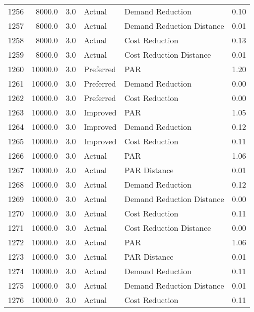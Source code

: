 \begin{longtable}{lrrllr}
1256 &       8000.0 &     3.0 &         Actual &           Demand Reduction &   0.10 \\
1257 &       8000.0 &     3.0 &         Actual &  Demand Reduction Distance &   0.01 \\
1258 &       8000.0 &     3.0 &         Actual &             Cost Reduction &   0.13 \\
1259 &       8000.0 &     3.0 &         Actual &    Cost Reduction Distance &   0.01 \\
1260 &      10000.0 &     3.0 &      Preferred &                        PAR &   1.20 \\
1261 &      10000.0 &     3.0 &      Preferred &           Demand Reduction &   0.00 \\
1262 &      10000.0 &     3.0 &      Preferred &             Cost Reduction &   0.00 \\
1263 &      10000.0 &     3.0 &       Improved &                        PAR &   1.05 \\
1264 &      10000.0 &     3.0 &       Improved &           Demand Reduction &   0.12 \\
1265 &      10000.0 &     3.0 &       Improved &             Cost Reduction &   0.11 \\
1266 &      10000.0 &     3.0 &         Actual &                        PAR &   1.06 \\
1267 &      10000.0 &     3.0 &         Actual &               PAR Distance &   0.01 \\
1268 &      10000.0 &     3.0 &         Actual &           Demand Reduction &   0.12 \\
1269 &      10000.0 &     3.0 &         Actual &  Demand Reduction Distance &   0.00 \\
1270 &      10000.0 &     3.0 &         Actual &             Cost Reduction &   0.11 \\
1271 &      10000.0 &     3.0 &         Actual &    Cost Reduction Distance &   0.00 \\
1272 &      10000.0 &     3.0 &         Actual &                        PAR &   1.06 \\
1273 &      10000.0 &     3.0 &         Actual &               PAR Distance &   0.01 \\
1274 &      10000.0 &     3.0 &         Actual &           Demand Reduction &   0.11 \\
1275 &      10000.0 &     3.0 &         Actual &  Demand Reduction Distance &   0.01 \\
1276 &      10000.0 &     3.0 &         Actual &             Cost Reduction &   0.11 \\

\end{longtable}
